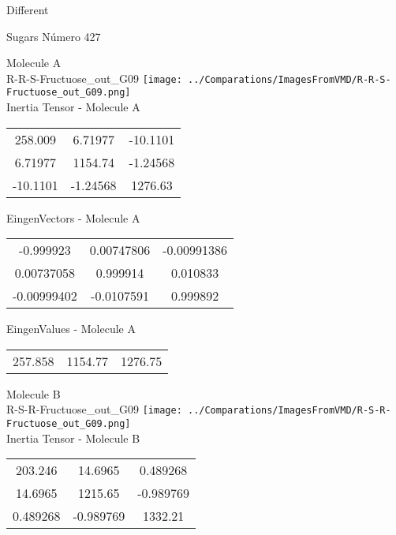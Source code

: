 \begin{center}
\vtab
\vtab
\textcolor{NavyBlue}{\Large Different}
\end{center}

 \newpage

\vtab[-2cm]
\begin{center}
{\large Sugars \tab Número 427}
\end{center}
\begin{multicols}{2}
\begin{center}

Molecule A \\ 
R-R-S-Fructuose\_out\_G09
\texttt{[image: ../Comparations/ImagesFromVMD/R-R-S-Fructuose\_out\_G09.png]}
\\
Inertia Tensor - Molecule A \\
\vtab

\begin{tabular}{|c c c|}
258.009	 & 	6.71977	 & 	-10.1101	 \\
6.71977	 & 	1154.74	 & 	-1.24568	 \\
-10.1101	 & 	-1.24568	 & 	1276.63
\end{tabular}

\vtab
 EingenVectors - Molecule A     \\
\vtab
\begin{tabular}{|c c c|}
-0.999923	 & 	0.00747806	 & 	-0.00991386	 \\
0.00737058	 & 	0.999914	 & 	0.010833	 \\
-0.00999402	 & 	-0.0107591	 & 	0.999892
\end{tabular}

\vtab
 EingenValues - Molecule A     \\
\vtab
\begin{tabular}{|c c c|}
257.858	 & 	1154.77	 & 	1276.75	 \\
\end{tabular}
\columnbreak

Molecule B \\ 
R-S-R-Fructuose\_out\_G09
\texttt{[image: ../Comparations/ImagesFromVMD/R-S-R-Fructuose\_out\_G09.png]}
\\
Inertia Tensor - Molecule B \\
\vtab

\begin{tabular}{|c c c|}
203.246	 & 	14.6965	 & 	0.489268	 \\
14.6965	 & 	1215.65	 & 	-0.989769	 \\
0.489268	 & 	-0.989769	 & 	1332.21
\end{tabular}


\end{center}
\end{multicols}
